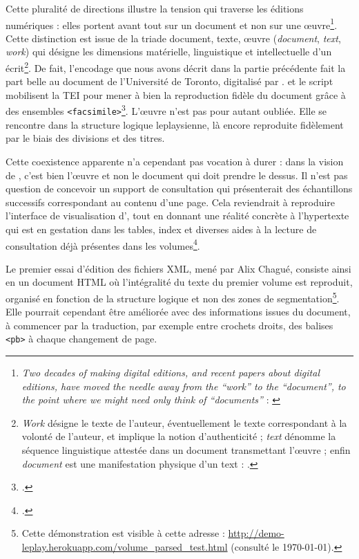Cette pluralité de directions illustre la tension qui traverse les éditions numériques : elles portent avant tout sur un document et non sur une \oe{}uvre\footnote{\og \textit{Two decades of making digital editions, and recent papers about digital editions, have moved the needle away from the “work” to the “document”, to the point where we might need only think of “documents”} \fg{} : \cite[p. 107]{robinson}}. Cette distinction est issue de la triade document, texte, \oe{}uvre (\textit{document}, \textit{text}, \textit{work}) qui désigne les dimensions matérielle, linguistique et intellectuelle d'un écrit\footnote{\og \textit{Work} désigne le texte de l’auteur, éventuellement le texte correspondant à la volonté de l’auteur, et implique la notion d’authenticité ; \textit{text} dénomme la séquence linguistique attestée dans un document transmettant l’œuvre ; enfin \textit{document} est une manifestation physique d’un text \fg{} : \cite[p. 15-16]{duval}.}. De fait, l'encodage que nous avons décrit dans la partie précédente fait la part belle au document \odm{} de l'Université de Toronto, digitalisé par \ia. \transkribus{} et le script \lse{} mobilisent la TEI pour mener à bien la reproduction fidèle du document grâce à des ensembles \texttt{<facsimile>}\footcite[p. 124]{robinson}. L'\oe{}uvre n'est pas pour autant oubliée. Elle se rencontre dans la structure logique leplaysienne, là encore reproduite fidèlement par le biais des divisions et des titres.

Cette coexistence apparente n'a cependant pas vocation à durer : dans la vision de \timeus, c'est bien l'\oe{}uvre et non le document qui doit prendre le dessus. Il n'est pas question de concevoir un support de consultation qui présenterait des échantillons successifs correspondant au contenu d'une page. Cela reviendrait à reproduire l'interface de visualisation d'\ia, tout en donnant une réalité concrète à l'hypertexte qui est \og en gestation dans les tables, index et diverses aides à la lecture de consultation déjà présentes \fg{} dans les volumes\footcite[p. 19]{duval}.

Le premier essai d'édition des fichiers XML, mené par Alix Chagué, consiste ainsi en un document HTML où l'intégralité du texte du premier volume est reproduit, organisé en fonction de la structure logique et non des zones de segmentation\footnote{Cette démonstration est visible à cette adresse : \url{http://demo-leplay.herokuapp.com/volume_parsed_test.html} (consulté le \today).}. Elle pourrait cependant être améliorée avec des informations issues du document, à commencer par la traduction, par exemple entre crochets droits, des balises \texttt{<pb>} à chaque changement de page.

